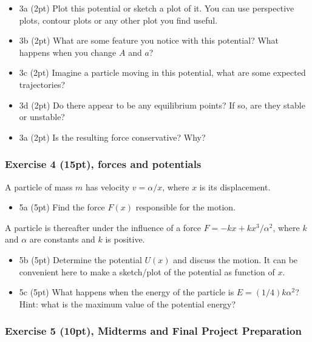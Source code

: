 \documentclass[11pt]{article}
\providecommand{\tightlist}{%
      \setlength{\itemsep}{0pt}\setlength{\parskip}{0pt}}
\begin{document}
\begin{itemize}
\tightlist
\item
  3a (2pt) Plot this potential or sketch a plot of it. You can use
  perspective plots, contour plots or any other plot you find useful.
\item
  3b (2pt) What are some feature you notice with this potential? What
  happens when you change \(A\) and \(a\)?
\item
  3c (2pt) Imagine a particle moving in this potential, what are some
  expected trajectories?
\item
  3d (2pt) Do there appear to be any equilibrium points? If so, are they
  stable or unstable?
\item
  3a (2pt) Is the resulting force conservative? Why?
\end{itemize}

    \subsubsection{Exercise 4 (15pt), forces and
potentials}\label{exercise-4-15pt-forces-and-potentials}

A particle of mass \(m\) has velocity \(v=\alpha/x\), where \(x\) is its
displacement.

\begin{itemize}
\tightlist
\item
  5a (5pt) Find the force \(F(x)\) responsible for the motion.
\end{itemize}

A particle is thereafter under the influence of a force
\(F=-kx+kx^3/\alpha^2\), where \(k\) and \(\alpha\) are constants and
\(k\) is positive.

\begin{itemize}
\item
  5b (5pt) Determine the potential \(U(x)\) and discuss the motion. It
  can be convenient here to make a sketch/plot of the potential as
  function of \(x\).
\item
  5c (5pt) What happens when the energy of the particle is
  \(E=(1/4)k\alpha^2\)? Hint: what is the maximum value of the potential
  energy?
\end{itemize}

    \subsubsection{Exercise 5 (10pt), Midterms and Final Project
Preparation}\label{exercise-5-10pt-midterms-and-final-project-preparation}
\end{document}

